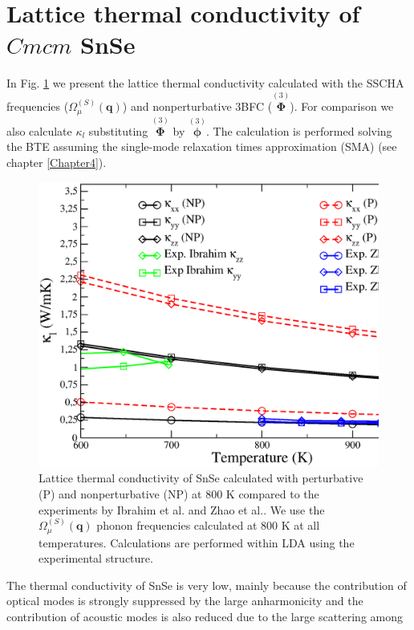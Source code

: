\section{Lattice thermal conductivity of $Cmcm$ SnSe}

In Fig. \ref{thermal-snse} we present the lattice thermal conductivity calculated with the SSCHA frequencies ($\Omega^{(S)}_{\mu}(\boldsymbol{q})$) and nonperturbative 3BFC ($\overset{(3)}{\boldsymbol{\Phi}}$). For comparison 
we also calculate $\kappa_{l}$ substituting $\overset{(3)}{\boldsymbol{\Phi}}$ by $\overset{(3)}{\boldsymbol{\phi}}$. The calculation is performed solving the BTE assuming the single-mode relaxation times approximation (SMA) (see 
chapter \ref{Chapter4}).
\begin{figure}[h]
\includegraphics[width=\linewidth]{Figures/tk-snse.eps}
\caption[Lattice thermla conductivity of SnSe]{Lattice thermal conductivity of SnSe calculated with perturbative (P) and nonperturbative (NP) at $800$ K compared to the experiments by Ibrahim et al.\cite{ibrahim2017reinvestigation} 
and Zhao et al.\cite{zhao2014ultralow}. We use the $\Omega^{(S)}_{\mu}(\mathbf{q})$ phonon frequencies calculated at $800$ K at all temperatures. Calculations are performed within LDA using the experimental structure.}
\label{thermal-snse}
\end{figure}
The thermal conductivity of SnSe is very low, mainly because the contribution of optical modes is strongly suppressed by the large anharmonicity and the contribution of acoustic modes is also reduced due to the large scattering among 

